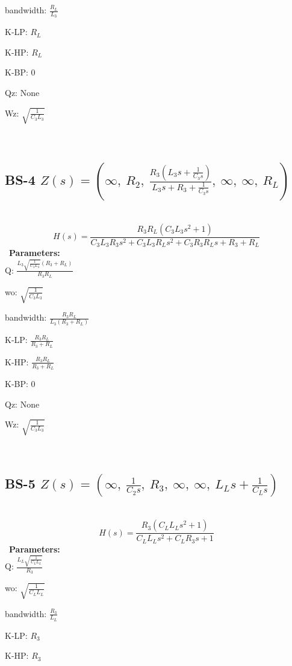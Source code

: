 \documentclass{article}
\begin{document}
bandwidth: $\frac{R_{L}}{L_{3}}$\ 

K-LP: $R_{L}$\ 

K-HP: $R_{L}$\ 

K-BP: $0$\ 

Qz: $\text{None}$\ 

Wz: $\sqrt{\frac{1}{C_{3} L_{3}}}$\ 

\ 

\subsection{BS-4 $Z(s) = \left( \infty, \  R_{2}, \  \frac{R_{3} \left(L_{3} s + \frac{1}{C_{3} s}\right)}{L_{3} s + R_{3} + \frac{1}{C_{3} s}}, \  \infty, \  \infty, \  R_{L}\right)$ } \ 
\textbf{\[H(s) = \frac{R_{3} R_{L} \left(C_{3} L_{3} s^{2} + 1\right)}{C_{3} L_{3} R_{3} s^{2} + C_{3} L_{3} R_{L} s^{2} + C_{3} R_{3} R_{L} s + R_{3} + R_{L}}\] } \ 
\textbf{Parameters:}\\ 

Q: $\frac{L_{3} \sqrt{\frac{1}{C_{3} L_{3}}} \left(R_{3} + R_{L}\right)}{R_{3} R_{L}}$\ 

wo: $\sqrt{\frac{1}{C_{3} L_{3}}}$\ 

bandwidth: $\frac{R_{3} R_{L}}{L_{3} \left(R_{3} + R_{L}\right)}$\ 

K-LP: $\frac{R_{3} R_{L}}{R_{3} + R_{L}}$\ 

K-HP: $\frac{R_{3} R_{L}}{R_{3} + R_{L}}$\ 

K-BP: $0$\ 

Qz: $\text{None}$\ 

Wz: $\sqrt{\frac{1}{C_{3} L_{3}}}$\ 

\ 

\subsection{BS-5 $Z(s) = \left( \infty, \  \frac{1}{C_{2} s}, \  R_{3}, \  \infty, \  \infty, \  L_{L} s + \frac{1}{C_{L} s}\right)$ } \ 
\textbf{\[H(s) = \frac{R_{3} \left(C_{L} L_{L} s^{2} + 1\right)}{C_{L} L_{L} s^{2} + C_{L} R_{3} s + 1}\] } \ 
\textbf{Parameters:}\\ 

Q: $\frac{L_{L} \sqrt{\frac{1}{C_{L} L_{L}}}}{R_{3}}$\ 

wo: $\sqrt{\frac{1}{C_{L} L_{L}}}$\ 

bandwidth: $\frac{R_{3}}{L_{L}}$\ 

K-LP: $R_{3}$\ 

K-HP: $R_{3}$\ 
\end{document}
